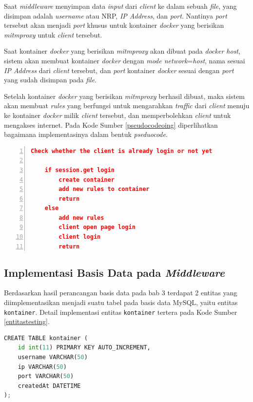 Saat \textit{middleware} menyimpan data \textit{input} dari \textit{client} ke dalam sebuah \textit{file}, yang disimpan adalah \textit{username} atau NRP, \textit{IP Address}, dan \textit{port}. Nantinya \textit{port} tersebut akan menjadi \textit{port} khusus untuk kontainer \textit{docker} yang berisikan \textit{mitmproxy} untuk \textit{client} tersebut.

Saat kontainer \textit{docker} yang berisikan \textit{mitmproxy} akan dibuat pada \textit{docker host}, sistem akan membuat kontainer \textit{docker} dengan \textit{mode network}=\textit{host}, nama sesuai \textit{IP Address} dari \textit{client} tersebut, dan \textit{port} kontainer \textit{docker} sesuai dengan \textit{port} yang sudah disimpan pada \textit{file}.

Setelah kontainer \textit{docker} yang berisikan \textit{mitmproxy} berhasil dibuat, maka sistem akan membuat \textit{rules} yang berfungsi untuk mengarahkan \textit{traffic} dari \textit{client} menuju ke kontainer \textit{docker} milik \textit{client} tersebut, dan memperbolehkan \textit{client} untuk mengakses internet. Pada Kode Sumber \ref{pseudocodeoing} diperlihatkan bagaimana implementasinya dalam bentuk \textit{pseduocode}.
\newline

\begin{minipage}{\linewidth}  
	\begin{lstlisting}[numbers=left, frame=single,tabsize=2,breaklines,caption={Pseudocode Web Service},label=pseudocodeoing,language=json]
	Check whether the client is already login or not yet
	
	if session.get login
		create container
		add new rules to container
		return
	else
		add new rules
		client open page login
		client login
		return  	
	\end{lstlisting}
\end{minipage}

\subsection{Implementasi Basis Data pada \textit{Middleware}}
Berdasarkan hasil perancangan basis data pada bab 3 terdapat 2 entitas yang diimplementasikan menjadi suatu tabel pada basis data MySQL, yaitu entitas \texttt{kontainer}. Detail implementasi entitas \texttt{kontainer} tertera pada Kode Sumber \ref{entitastesting}.
\newline
\begin{lstlisting}[frame=single,tabsize=2,breaklines,captionpos=b,language=python, caption=\textit{Query} untuk membuat tabel testing,label=entitastesting]
CREATE TABLE kontainer (
	id int(11) PRIMARY KEY AUTO_INCREMENT,
	username VARCHAR(50)
	ip VARCHAR(50)
	port VARCHAR(50)
	createdAt DATETIME
);
\end{lstlisting}


